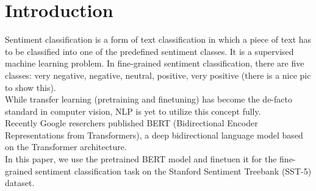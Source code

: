 \section{Introduction}

Sentiment classification is a form of text classification in which a piece of
text has to be classified into one of the predefined sentiment classes.
It is a supervised machine learning problem.
In fine-grained sentiment classification, there are five classes: very negative,
negative, neutral, positive, very positive (there is a nice pic to show this).\\
While transfer learning (pretraining and finetuning) has become the de-facto
standard in computer vision, NLP is yet to utilize this concept fully.\\
Recently Google reserchers published BERT (Bidirectional Encoder Representations
from Transformers), a deep bidirectional language model based on the Transformer
architecture.\\
In this paper, we use the pretrained BERT model and finetuen it for the
fine-grained sentiment classification task on the Stanford Sentiment Treebank
(SST-5) dataset.
